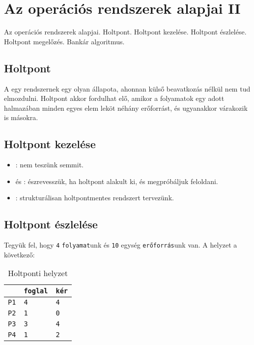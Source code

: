 \documentclass[../main.tex]{subfiles}
\begin{document}
\section{Az operációs rendszerek alapjai II}

\begin{fulltheorem}
  Az operációs rendszerek alapjai. Holtpont. Holtpont kezelése.
  Holtpont észlelése. Holtpont megelőzés. Bankár algoritmus.
\end{fulltheorem}

\subsection{Holtpont}

A  egy rendszernek egy olyan állapota, ahonnan külső beavatkozás
nélkül nem tud elmozdulni. Holtpont akkor fordulhat elő, amikor a folyamatok
egy adott halmazában minden egyes elem leköt néhány erőforrást, és ugyanakkor
várakozik is másokra.

\subsection{Holtpont kezelése}

\begin{itemize}
  \item {}:
        nem teszünk semmit.

  \item {} és :
        észrevesszük, ha holtpont alakult ki, és megpróbáljuk feloldani.

  \item {}:
        strukturálisan holtpontmentes rendszert tervezünk.
\end{itemize}

\subsection{Holtpont észlelése}

Tegyük fel, hogy \texttt{4} \texttt{folyamat}unk és \texttt{10}
egység \texttt{erőforrás}unk van. A helyzet a következő:
\begin{table}[H]
  \centering\begin{tabular}{|p{1.5cm} |p{1.5cm} |p{1.5cm} |}
    \hline
                           & \texttt{foglal} & \texttt{kér}
    \\ \hline
    \texttt{\color{red}P1} & \texttt{4}      & \texttt{\color{red}4} \\
    \texttt{P2}            & \texttt{1}      & \texttt{0}            \\
    \texttt{\color{red}P3} & \texttt{3}      & \texttt{\color{red}4} \\
    \texttt{P4}            & \texttt{1}      & \texttt{2}            \\
    \hline
  \end{tabular}
  \caption{Holtponti helyzet}
  \label{table:deadlock}
\end{table}
\end{document}

